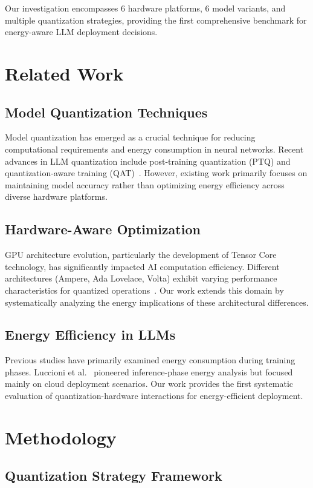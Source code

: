 \documentclass[sigconf]{acmart}
\begin{document}
Our investigation encompasses 6 hardware platforms, 6 model variants, and multiple quantization strategies, providing the first comprehensive benchmark for energy-aware LLM deployment decisions.

\section{Related Work}

\subsection{Model Quantization Techniques}
Model quantization has emerged as a crucial technique for reducing computational requirements and energy consumption in neural networks. Recent advances in LLM quantization include post-training quantization (PTQ) and quantization-aware training (QAT)~\cite{dettmers2022llm}. However, existing work primarily focuses on maintaining model accuracy rather than optimizing energy efficiency across diverse hardware platforms.

\subsection{Hardware-Aware Optimization}
GPU architecture evolution, particularly the development of Tensor Core technology, has significantly impacted AI computation efficiency. Different architectures (Ampere, Ada Lovelace, Volta) exhibit varying performance characteristics for quantized operations~\cite{markidis2018nvidia}. Our work extends this domain by systematically analyzing the energy implications of these architectural differences.

\subsection{Energy Efficiency in LLMs}
Previous studies have primarily examined energy consumption during training phases. Luccioni et al.~\cite{luccioni2022estimating} pioneered inference-phase energy analysis but focused mainly on cloud deployment scenarios. Our work provides the first systematic evaluation of quantization-hardware interactions for energy-efficient deployment.

\section{Methodology}

\subsection{Quantization Strategy Framework}
\end{document}
